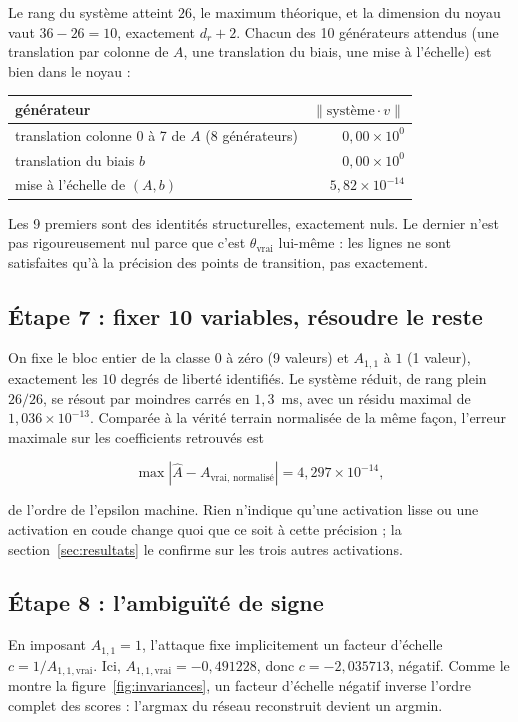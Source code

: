 \documentclass[11pt]{article}
\begin{document}
Le rang du système atteint $26$, le maximum théorique, et la dimension du
noyau vaut $36-26=10$, exactement $d_r+2$. Chacun des 10 générateurs
attendus (une translation par colonne de $A$, une translation du biais, une
mise à l'échelle) est bien dans le noyau :

\begin{center}
\begin{tabular}{lr}
\toprule
générateur & $\|\text{système} \cdot v\|$ \\
\midrule
translation colonne 0 à 7 de $A$ (8 générateurs) & $0{,}00 \times 10^{0}$ \\
translation du biais $b$ & $0{,}00 \times 10^{0}$ \\
mise à l'échelle de $(A,b)$ & $5{,}82 \times 10^{-14}$ \\
\bottomrule
\end{tabular}
\end{center}

Les 9 premiers sont des identités structurelles, exactement nuls. Le
dernier n'est pas rigoureusement nul parce que c'est $\theta_{\text{vrai}}$
lui-même : les lignes ne sont satisfaites qu'à la précision des points de
transition, pas exactement.

\subsection*{Étape 7 : fixer 10 variables, résoudre le reste}

On fixe le bloc entier de la classe 0 à zéro (9 valeurs) et $A_{1,1}$ à $1$
(1 valeur), exactement les $10$ degrés de liberté identifiés. Le système
réduit, de rang plein $26/26$, se résout par moindres carrés en $1{,}3$~ms,
avec un résidu maximal de $1{,}036 \times 10^{-13}$. Comparée à la vérité
terrain normalisée de la même façon, l'erreur maximale sur les coefficients
retrouvés est

\[
\max |\hat A - A_{\text{vrai, normalisé}}| = 4{,}297 \times 10^{-14},
\]

de l'ordre de l'epsilon machine. Rien n'indique qu'une activation lisse ou
une activation en coude change quoi que ce soit à cette précision ; la
section~\ref{sec:resultats} le confirme sur les trois autres activations.

\subsection*{Étape 8 : l'ambiguïté de signe}

En imposant $A_{1,1}=1$, l'attaque fixe implicitement un facteur d'échelle
$c = 1 / A_{1,1,\text{vrai}}$. Ici, $A_{1,1,\text{vrai}} = -0{,}491228$,
donc $c = -2{,}035713$, négatif. Comme le montre la
figure~\ref{fig:invariances}, un facteur d'échelle négatif inverse l'ordre
complet des scores : l'argmax du réseau reconstruit devient un argmin.
\end{document}
